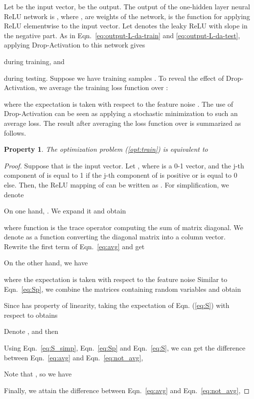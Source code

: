 \documentclass[11pt]{article}
\newtheorem{property}[theorem]{Property}
\begin{document}
Let  be the input vector,  be the output. The output of the one-hidden layer neural ReLU network is , where ,  are weights of the network,  is the function for applying ReLU elementwise to the input vector. Let  denotes the leaky ReLU with slope  in the negative part. As in Eqn.~\eqref{eq:output-L-da-train} and \eqref{eq:output-L-da-test}, applying Drop-Activation to this network gives

during training, and

during testing. Suppose we have  training samples . To reveal the effect of Drop-Activation, we average the training loss function over :

where the expectation is taken with respect to the feature noise . The use of Drop-Activation can be seen as applying a stochastic minimization to such an average loss. The result after averaging the loss function over  is summarized as follows.
\begin{property}
	The optimization problem (\ref{opt:train}) is equivalent to
	
	\label{prop1}
	\vspace{-0.5cm}
\end{property}

\begin{proof}
Suppose that  is the input vector. Let , where  is a 0-1 vector, and the j-th component of  is equal to 1 if the j-th component of  is positive or is equal to 0 else. Then, the ReLU mapping of  can be written as . For simplification, we denote


On one hand, . We expand it and obtain

where function  is the trace operator computing the sum of matrix diagonal. We denote  as a function converting the diagonal matrix into a column vector. Rewrite the first term of Eqn.~\eqref{eq:avg} and get


On the other hand, we have

where the expectation is taken with respect to the feature noise  Similar to Eqn.~\eqref{eq:Sp}, we combine the matrices containing random variables and obtain


Since  has property of linearity, taking the expectation of Eqn. (\ref{eq:S}) with respect to  obtains


Denote , and then


Using Eqn.~\eqref{eq:S_simp}, Eqn.~\eqref{eq:Sp} and Eqn.~\eqref{eq:S}, we can get the difference between Eqn.~\eqref{eq:avg} and Eqn.~\eqref{eq:not_avg},


Note that , so we have


Finally, we attain the difference between Eqn.~\eqref{eq:avg} and Eqn.~\eqref{eq:not_avg},

\end{proof}
\end{document}
